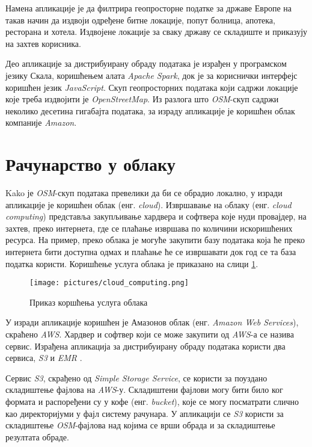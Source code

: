 \documentclass[12pt,oneside]{memoir}
\begin{document}
Намена апликације је да филтрира геопросторне податке за државе Европе на такав начин да издвоји одређене битне локације, попут болница, апотека, ресторана и хотела. Издвојене локације за сваку државу се складиште и приказују на захтев корисника. 

Део апликације за дистрибуирану обраду података је израђен у програмском језику Скала, коришћењем алата \textit{Apache Spark}, док је за кориснички интерфејс коришћен језик \textit{JavaScript}. Скуп геопросторних података који садржи локације које треба издвојити је \textit{OpenStreetMap}. Из разлога што \textit{OSM}-скуп садржи неколико десетина гигабајта података, за израду апликације је коришћен облак компаније \textit{Amazon}.

\section{Рачунарство у облаку}
\label{sec:cloud}

Kako је \textit{OSM}-скуп података превелики да би се обрадио локално, у изради апликације је коришћен облак (енг. \textit{cloud}). Извршавање на oблаку (енг. \textit{cloud computing}) \cite{cloud_computing} представља закупљивање хардвера и софтвера које нуди провајдер, на захтев, преко интернета, где се плаћање извршава по количини искоришћених ресурса. На пример, преко облака је могуће закупити базу података која ће преко интернета бити доступна одмах и плаћање ће се извршавати док год се та база податка користи. Коришћење услуга облака је приказано на слици \ref{fig:cloud_comp_example}.

\begin{figure}[!ht]
  \centering
  \texttt{[image: pictures/cloud\_computing.png]}
  \caption{Приказ коршћења услуга облака}
  \label{fig:cloud_comp_example}
\end{figure}

У изради апликације коришћен је Амазонов облак (енг. \textit{Amazon Web Services}), скраћено \textit{AWS}. Хардвер и софтвер који се може закупити од \textit{AWS}-а се назива сервис. Израђена апликација за дистрибуирану обраду података користи два сервиса, \textit{S3} \cite{s3} и \textit{EMR} \cite{emr}.


Сервис \textit{S3}, скрађено од \textit{Simple Storage Service}, се користи за поуздано складиштење фајлова на \textit{AWS}-у. Складиштени фајлови могу бити било ког формата и распоређени су у кофе (енг. \textit{bucket}), које се могу посматрати слично као директоријуми у фајл систему рачунара. У апликацији се \textit{S3} користи за складиштење \textit{OSM}-фајлова над којима се врши обрада и за складиштење резултата обраде.
\end{document}
